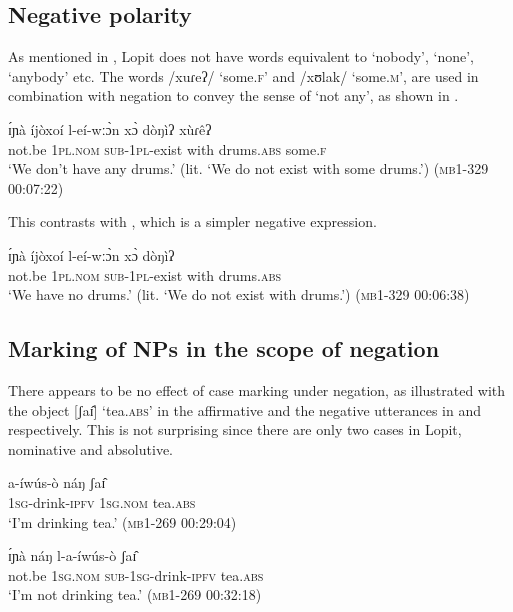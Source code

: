 \documentclass[output=paper,colorlinks,citecolor=brown,draftmode]{langscibook}
\begin{document}
\subsection{Negative polarity}
\label{sec:lop:4.2}
As mentioned in , Lopit does not have words equivalent to ‘nobody’, ‘none’, ‘anybody’ etc. The words /xuɾeʔ/ ‘some.\textsc{f}’ and /xʊlak/ ‘some.\textsc{m}’, are used in combination with negation to convey the sense of ‘not any’, as shown in .

\ea\label{ex:lop:94}
        \gll ɪ́ɲà íjòxoí l-eí-wːɔ̀n xɔ̀ dòŋìʔ xùɾêʔ \\ 
             not.be 1\textsc{pl.nom} \textsc{sub-1pl-}exist with drums.\textsc{abs} some.\textsc{f} \\
        \glt ‘We don’t have any drums.’ (lit. ‘We do not exist with some drums.’) (\textsc{mb1-}329 00:07:22)
\z

This contrasts with , which is a simpler negative expression.

\ea\label{ex:lop:95}
        \gll ɪ́ɲà íjòxoí l-eí-wːɔ̀n xɔ̀ dòŋìʔ   \\ 
             not.be 1\textsc{pl.nom} \textsc{sub-1pl-}exist with drums.\textsc{abs} \\
        \glt ‘We have no drums.’ (lit. ‘We do not exist with drums.’) (\textsc{mb1-}329 00:06:38)
\z

\subsection{Marking of NPs in the scope of negation}
\label{sec:lop:4.3}

There appears to be no effect of case marking under negation, as illustrated with the object [ʃaɪ̂] ‘tea.\textsc{abs}’ in the affirmative and the negative utterances in  and  respectively. This is not surprising since there are only two cases in Lopit, nominative and absolutive.

\ea\label{ex:lop:96}
        \gll a-íwús-ò náŋ ʃaɪ̂ \\ 
             \textsc{1sg}{}-drink-\textsc{ipfv} 1\textsc{sg.nom} tea.\textsc{abs} \\
        \glt ‘I’m drinking tea.’  (\textsc{mb1-269} \textsc{00}:29:04)
\z

\ea\label{ex:lop:97}
        \gll ɪ́ɲà náŋ l-a-íwús-ò ʃaɪ̂ \\ 
             not.be 1\textsc{sg.nom} \textsc{sub-1sg}{}-drink-\textsc{ipfv} tea.\textsc{abs} \\
        \glt ‘I’m not drinking tea.’  (\textsc{mb1-269} \textsc{00}:32:18)
\z
\end{document}
